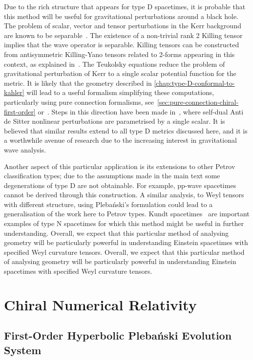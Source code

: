 \documentclass[10pt]{report}
\newcommand{\pleb}[0]{Pleba\'nski}
\theoremstyle{definition}
\begin{document}
    Due to the rich structure that appears for type D spacetimes, it is probable that this method will be useful for gravitational perturbations around a black hole. The problem of scalar, vector and tensor perturbations in the Kerr background are known to be separable~\cite{TheMathematicaChandr1998}. The existence of a non-trivial rank 2 Killing tensor implies that the wave operator is separable. Killing tensors can be constructed from antisymmetric Killing-Yano tensors related to 2-forms appearing in this context, as explained in~\cite{Killing2FormsGauduc2017}. The Teukolsky equations reduce the problem of gravitational perturbation of Kerr to a single scalar potential function for the metric. It is likely that the geometry described in \cref{chap:type-D-conformal-to-kahler} will lead to a useful formalism simplifying these computations, particularly using pure connection formalisms, see~\ref{sec:pure-connection-chiral-first-order} or~\cite{Gravity_as_a_di_Krasno_2011}. Steps in this direction have been made in~\cite{Pure_connection_Krasno_2024}, where self-dual Anti de Sitter nonlinear perturbations are parametrised by a single scalar. It is believed that similar results extend to all type D metrics discussed here, and it is a worthwhile avenue of research due to the increasing interest in gravitational wave analysis.

    Another aspect of this particular application is its extensions to other Petrov classification types; due to the assumptions made in the main text some degenerations of type D are not obtainable. For example, pp-wave spacetimes cannot be derived through this construction. A similar analysis, to Weyl tensors with different structure, using \pleb{}'s formulation could lead to a generalisation of the work here to Petrov types. Kundt spacetimes~\cite{Coley2009} are important examples of type N spacetimes for which this method might be useful in further understanding. Overall, we expect that this particular method of analysing geometry will be particularly powerful in understanding Einstein spacetimes with specified Weyl curvature tensors. Overall, we expect that this particular method of analysing geometry will be particularly powerful in understanding Einstein spacetimes with specified Weyl curvature tensors.

    \section{Chiral Numerical Relativity}

    \subsection{First-Order Hyperbolic \pleb{} Evolution System}
\end{document}
